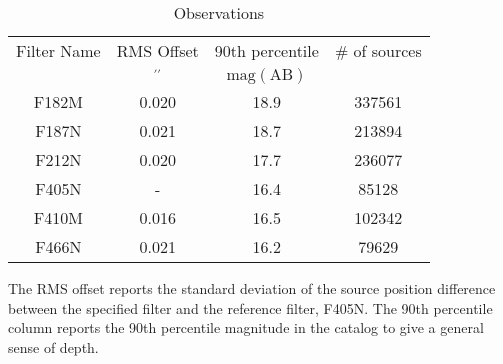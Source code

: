 \begin{table}
\caption{Observations \label{tab:observations}}
\begin{tabular}{cccc}
\hline \hline
Filter Name & RMS Offset & 90th percentile & \# of sources \\
 & $\mathrm{{}^{\prime\prime}}$ & $\mathrm{mag}$$\mathrm{\left( \mathrm{AB} \right)}$ &  \\
\hline
F182M & 0.020 & 18.9 & 337561 \\
F187N & 0.021 & 18.7 & 213894 \\
F212N & 0.020 & 17.7 & 236077 \\
F405N & - & 16.4 & 85128 \\
F410M & 0.016 & 16.5 & 102342 \\
F466N & 0.021 & 16.2 & 79629 \\
\hline
\end{tabular}
\par
The RMS offset reports the standard deviation of the source position difference between the specified filter and the reference filter, F405N.
The 90th percentile column reports the 90th percentile magnitude in the catalog to give a general sense of depth.
\end{table}
